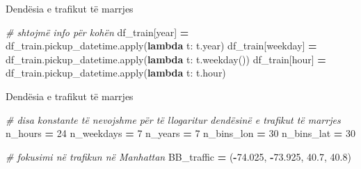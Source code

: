 \documentclass[
  ignorenonframetext,
]{beamer}
\newenvironment{Shaded}{\begin{snugshade}}{\end{snugshade}}
\newcommand{\BuiltInTok}[1]{#1}
\newcommand{\CommentTok}[1]{\textcolor[rgb]{0.56,0.35,0.01}{\textit{#1}}}
\newcommand{\DecValTok}[1]{\textcolor[rgb]{0.00,0.00,0.81}{#1}}
\newcommand{\FloatTok}[1]{\textcolor[rgb]{0.00,0.00,0.81}{#1}}
\newcommand{\KeywordTok}[1]{\textcolor[rgb]{0.13,0.29,0.53}{\textbf{#1}}}
\newcommand{\NormalTok}[1]{#1}
\newcommand{\OperatorTok}[1]{\textcolor[rgb]{0.81,0.36,0.00}{\textbf{#1}}}
\newcommand{\StringTok}[1]{\textcolor[rgb]{0.31,0.60,0.02}{#1}}
\begin{document}
\begin{frame}[fragile]{Dendësia e trafikut të marrjes}
\protect\hypertarget{denduxebsia-e-trafikut-tuxeb-marrjes-1}{}

\begin{Shaded}
\begin{Highlighting}[]
\CommentTok{\# shtojmë info për kohën}
\NormalTok{df\_train[}\StringTok{\textquotesingle{}year\textquotesingle{}}\NormalTok{] }\OperatorTok{=}\NormalTok{ df\_train.pickup\_datetime.}\BuiltInTok{apply}\NormalTok{(}\KeywordTok{lambda}\NormalTok{ t: t.year)}
\NormalTok{df\_train[}\StringTok{\textquotesingle{}weekday\textquotesingle{}}\NormalTok{] }\OperatorTok{=}\NormalTok{ df\_train.pickup\_datetime.}\BuiltInTok{apply}\NormalTok{(}\KeywordTok{lambda}\NormalTok{ t: t.weekday())}
\NormalTok{df\_train[}\StringTok{\textquotesingle{}hour\textquotesingle{}}\NormalTok{] }\OperatorTok{=}\NormalTok{ df\_train.pickup\_datetime.}\BuiltInTok{apply}\NormalTok{(}\KeywordTok{lambda}\NormalTok{ t: t.hour)}
\end{Highlighting}
\end{Shaded}
\end{frame}

\begin{frame}[fragile]{Dendësia e trafikut të marrjes}
\protect\hypertarget{denduxebsia-e-trafikut-tuxeb-marrjes-2}{}

\begin{Shaded}
\begin{Highlighting}[]
\CommentTok{\# disa konstante të nevojshme për të llogaritur dendësinë e trafikut të marrjes}
\NormalTok{n\_hours }\OperatorTok{=} \DecValTok{24}
\NormalTok{n\_weekdays }\OperatorTok{=} \DecValTok{7}
\NormalTok{n\_years }\OperatorTok{=} \DecValTok{7}
\NormalTok{n\_bins\_lon }\OperatorTok{=} \DecValTok{30}
\NormalTok{n\_bins\_lat }\OperatorTok{=} \DecValTok{30}

\CommentTok{\# fokusimi në trafikun në Manhattan}
\NormalTok{BB\_traffic }\OperatorTok{=}\NormalTok{ (}\OperatorTok{{-}}\FloatTok{74.025}\NormalTok{, }\OperatorTok{{-}}\FloatTok{73.925}\NormalTok{, }\FloatTok{40.7}\NormalTok{, }\FloatTok{40.8}\NormalTok{)}
\end{Highlighting}
\end{Shaded}
\end{frame}
\end{document}
